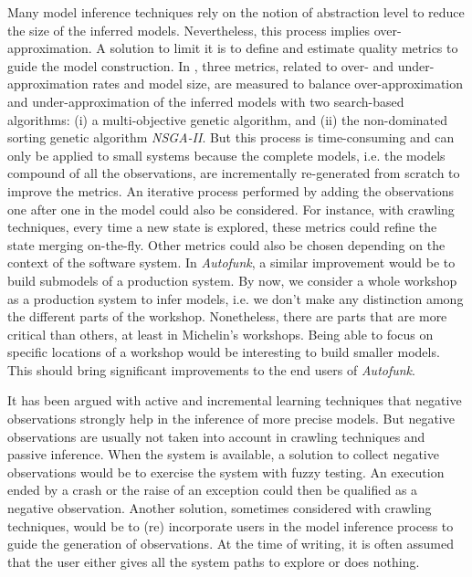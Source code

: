 Many model inference techniques rely on the notion of abstraction
level to reduce the size of the inferred models. Nevertheless,
this process implies over-approximation. A solution to limit it
is to define and estimate quality metrics
\cite{tonella2012finding,Lo20122063} to guide the model
construction. In \cite{tonella2012finding}, three metrics,
related to over- and under-approximation rates and model size,
are measured to balance over-approximation and
under-approximation of the inferred models with two search-based
algorithms: (i) a multi-objective genetic algorithm, and (ii) the
non-dominated sorting genetic algorithm \textit{NSGA-II}. But
this process is time-consuming and can only be applied to small
systems because the complete models, i.e. the models compound of
all the observations, are incrementally re-generated from scratch
to improve the metrics.  An iterative process performed by adding
the observations one after one in the model could also be
considered. For instance, with crawling techniques, every time a
new state is explored, these metrics could refine the state
merging on-the-fly. Other metrics could also be chosen depending
on the context of the software system. In \textit{Autofunk}, a
similar improvement would be to build submodels of a production
system. By now, we consider a whole workshop as a production
system to infer models, i.e. we don't make any distinction among
the different parts of the workshop. Nonetheless, there are parts
that are more critical than others, at least in Michelin's
workshops. Being able to focus on specific locations of a
workshop would be interesting to build smaller models. This
should bring significant improvements to the end users of
\textit{Autofunk}.

It has been argued with active and incremental learning
techniques that negative observations strongly help in the
inference of more precise models. But negative observations are
usually not taken into account in crawling techniques and passive
inference. When the system is available, a solution to collect
negative observations would be to exercise the system with fuzzy
testing. An execution ended by a crash or the raise of an
exception could then be qualified as a negative observation.
Another solution, sometimes considered with crawling techniques,
would be to (re) incorporate users in the model inference process
to guide the generation of observations. At the time of writing,
it is often assumed that the user either gives all the system
paths to explore or does nothing.

